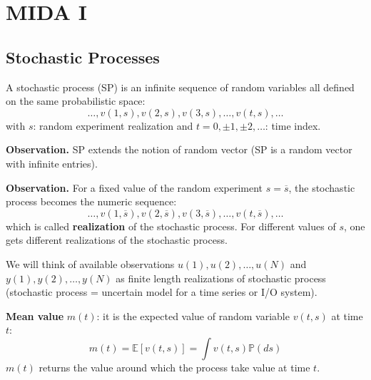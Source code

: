 \documentclass[10pt,a4paper,twoside,openright]{book}
\begin{document}
\tableofcontents



\AtEndDocument{\cleardoublepage}


\mainmatter
\pagestyle{fancy} %


\part{MIDA I}

\chapter{Stochastic Processes}
A stochastic process (SP) is an infinite sequence of random variables all defined on the same probabilistic space:
\[
	\ldots,v(1,s),v(2,s),v(3,s),\ldots,v(t,s),\ldots
\]
with $s$: random experiment realization and $t=0,\pm 1,\pm 2,\ldots$: time index.

\textbf{Observation.} SP extends the notion of random vector (SP is a random vector with infinite entries).

\textbf{Observation.} For a fixed value of the random experiment $s = \overline{s}$, the stochastic process becomes the numeric sequence:
\[
	\ldots,v(1,\overline{s}),v(2,\overline{s}),v(3,\overline{s}),\ldots,v(t,\overline{s}),\ldots
\]
which is called \textbf{realization} of the stochastic process.
For different values of $s$, one gets different realizations of the stochastic process.

We will think of available observations ${u(1),u(2),\ldots,u(N)}$ and ${y(1), y(2),\ldots, y(N)}$ as finite length realizations of stochastic process (stochastic process = uncertain model for a time series or I/O system).

\textbf{Mean value} $m(t)$: it is the expected value of random variable $v(t,s)$ at time $t$:
\[
	m(t)=\mathbb{E}[v(t, s)]=\int v(t, s) \mathbb{P}(ds)
\]
$m(t)$ returns the value around which the process take value at time $t$.
\end{document}

